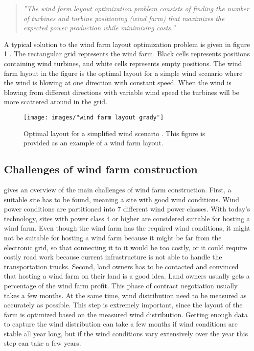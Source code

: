 \begin{quote}
\textit{''The wind farm layout optimization problem consists of finding the number of turbines and turbine positioning (wind farm) that maximizes the expected power production while minimizing costs.''}
\end{quote}


\noindent A typical solution to the wind farm layout optimization problem is given in figure \ref{figure:wind farm layout grady} \citep{Grady}. The rectangular grid represents the wind farm. Black cells represents positions containing wind turbines, and white cells represents empty positions. The wind farm layout in the figure is the optimal layout for a simple wind scenario where the wind is blowing at one direction with constant speed. When the wind is blowing from different directions with variable wind speed the turbines will be more scattered around in the grid.\\


\begin{figure}
\begin{center}
\texttt{[image: images/"wind farm layout grady"]}
\caption{Optimal layout for a simplified wind scenario \citep{Grady}. This figure is provided as an example of a wind farm layout.}
\label{figure:wind farm layout grady}
\end{center}
\end{figure}


\subsection{Challenges of wind farm construction}
\cite{Samorani} gives an overview of the main challenges of wind farm construction. First, a suitable site has to be found, meaning a site with good wind conditions. Wind power conditions are partitioned into 7 different wind power classes. With today's technology, sites with power class 4 or higher are considered suitable for hosting a wind farm. Even though the wind farm has the required wind conditions, it might not be suitable for hosting a wind farm because it might be far from the electronic grid, so that connecting it to it would be too costly, or it could require costly road work because current infrastructure is not able to handle the transportation trucks. Second, land owners has to be contacted and convinced that hosting a wind farm on their land is a good idea. Land owners usually gets a percentage of the wind farm profit. This phase of contract negotiation  usually takes a few months. At the same time, wind distribution need to be measured as accurately as possible. This step is extremely important, since the layout of the farm is optimized based on the measured wind distribution. Getting enough data to capture the wind distribution can take a few months if wind conditions are stable all year long, but if the wind conditions vary extensively over the year this step can take a few years. \\


